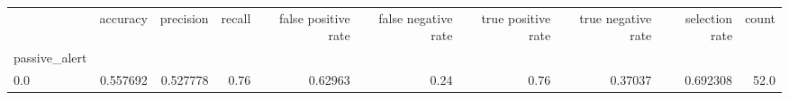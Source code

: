 \begin{tabular}{lrrrrrrrrr}
\toprule
{} &  accuracy &  precision &  recall &  false positive rate &  false negative rate &  true positive rate &  true negative rate &  selection rate &  count \\
passive\_alert &           &            &         &                      &                      &                     &                     &                 &        \\
\midrule
0.0           &  0.557692 &   0.527778 &    0.76 &              0.62963 &                 0.24 &                0.76 &             0.37037 &        0.692308 &   52.0 \\
\bottomrule
\end{tabular}
